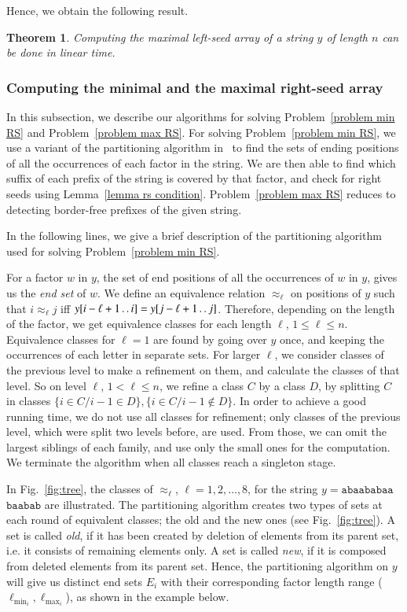 \documentclass[preprint,12pt]{elsarticle}
\newcommand{\dd}{\mathinner{\ldotp\ldotp}}
\newtheorem{theorem}{Theorem}[section]
\begin{document}
Hence, we obtain the following result.

\begin{theorem}
Computing the maximal left-seed array of a string $y$ of length $n$ can be done in linear time.
\end{theorem}


\subsubsection{Computing the minimal and the maximal right-seed array}

In this subsection, we describe our algorithms for solving Problem~\ref{problem min RS} and Problem~\ref{problem max RS}.
For solving Problem~\ref{problem min RS}, we use a variant of the partitioning algorithm in~\cite{C81,Iliopoulos96} to 
find the sets of ending positions of all the occurrences of each factor in the string. We are then able to find which suffix of each 
prefix of the string is covered by that factor, and check for right seeds using Lemma~\ref{lemma rs condition}. 
Problem~\ref{problem max RS} reduces to detecting border-free prefixes of the given string.

In the following lines, we give a brief description of the partitioning algorithm used for solving Problem~\ref{problem min RS}.

For a factor $w$ in $y$, the set of end positions of all the occurrences of $w$ in $y$, gives us the \emph{end set} of $w$.
We define an equivalence relation $\approx_{\ell}$ on positions of $y$ such that $i\approx _{\ell}j$ iff $y[i-\ell+1\dd i]=y[j-\ell+1\dd j]$.
Therefore, depending on the length of the factor, we get equivalence classes for each length $\ell$, $1\leq \ell \leq n$.
Equivalence classes for $\ell=1$ are found by going over $y$ once, and keeping the occurrences of each letter in separate sets.
For larger $\ell$, we consider classes of the previous level to make a refinement on them, and calculate the classes of that level.
So on level $\ell$, $1<\ell\leq n$, we refine a class $C$ by a class $D$, by splitting $C$ in classes $\{i\in C/i-1\in D\},\{i\in C/i-1 \notin D\}$.
In order to achieve a good running time, we do not use all classes for refinement; only classes of the previous level, which were split two
levels before, are used. From those, we can omit the largest siblings of each family, and use only the small ones for
the computation. We terminate the algorithm when all classes reach a singleton stage.

In Fig.~\ref{fig:tree}, the classes of $\approx_{\ell}$, ${\ell}=1,2,\ldots,8$, for the
string $y=\texttt{abaababaa}$\\$\texttt{baabab}$ are illustrated. The partitioning algorithm creates two types of sets at each round of equivalent
classes; the old and the new ones (see Fig.~\ref{fig:tree}). A set is called \emph{old}, if it has been created by deletion of elements from
its parent set, i.e. it consists of remaining elements only. A set is called \emph{new}, if it is composed from deleted elements from its parent 
set. Hence, the partitioning algorithm on $y$ will give us distinct end sets $E_{i}$ with their corresponding factor length range ($\ell_{\min_{i}}, \ell_{\max_{i}}$), 
as shown in the example below.
\end{document}
